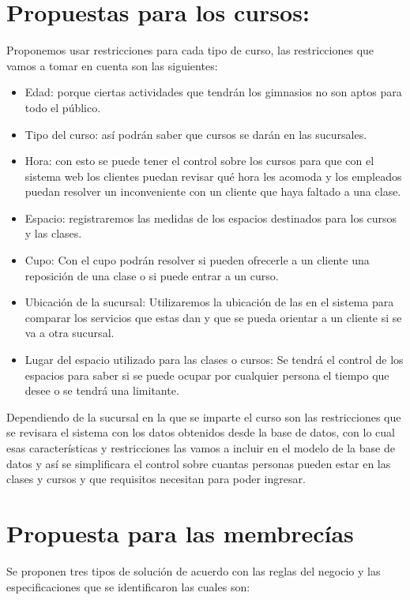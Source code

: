 \documentclass[12pt,letterpaper]{article}
\begin{document}
\section{Propuestas para los cursos:}
	Proponemos usar restricciones para cada tipo de curso, las restricciones que vamos a tomar en cuenta son las siguientes:	
		\begin{itemize}
			\item Edad: porque ciertas actividades que tendrán los gimnasios no son aptos para todo el público.
			\item Tipo del curso: así podrán saber que cursos se darán en las sucursales.
			\item Hora: con esto se puede tener el control sobre los cursos para que con el sistema web los clientes puedan revisar qué hora les acomoda y los empleados puedan resolver un inconveniente con un cliente que haya faltado a una clase.
			\item Espacio: registraremos las medidas de los espacios destinados para los cursos y las clases.
			\item Cupo: Con el cupo podrán resolver si pueden ofrecerle a un cliente una reposición de una clase o si puede entrar a un curso.
			\item Ubicación de la sucursal: Utilizaremos la ubicación de las en el sistema para comparar los servicios que estas dan y que se pueda orientar a un cliente si se va a otra sucursal. 
			\item Lugar del espacio utilizado para las clases o cursos: Se tendrá el control de los espacios para saber si se puede ocupar por cualquier persona el tiempo que desee o se tendrá una limitante.
		\end{itemize}
			
			Dependiendo de la sucursal en la que se imparte el curso son las restricciones que se revisara el sistema con los datos obtenidos desde la base de datos, con lo cual esas características y restricciones las vamos a incluir en el modelo de la base de datos y así se simplificara el control sobre cuantas personas pueden estar en las clases y cursos y que requisitos necesitan para poder ingresar.
\section{Propuesta para las membrecías}
    Se proponen tres tipos de solución de acuerdo con las reglas del negocio y las especificaciones que se identificaron las cuales son:
\end{document}
